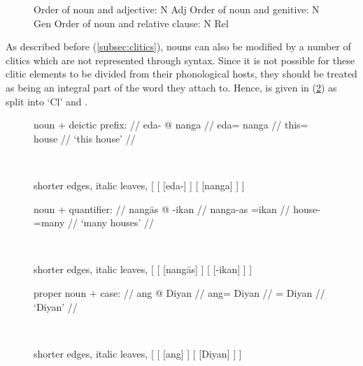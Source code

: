 \begin{figure}
\pex\label{ex:nptyp}
\a Order of noun and adjective: N Adj
\a Order of noun and genitive: N Gen
\a Order of noun and relative clause: N Rel
\xe
\end{figure}

As described before (\autoref{subsec:clitics}), nouns can also be modified
by a number of clitics which are not represented through syntax. Since it is
not possible for these clitic elements to be divided from their phonological
hosts, they should be treated as being an integral part of the word they attach
to. Hence,  is given in (\ref{ex:nouncltree}) as split into `Cl' and
.

\begin{figure}
\pex\label{ex:nouncltree}
\a %
	\begin{minipage}[t]{.5\remaining}
	\begingl
		\glpreamble noun + deictic prefix: //
		\gla eda- @ nanga //
		\glb eda= nanga //
		\glc this= house //
		\glft `this house' //
	\endgl
	\end{minipage}
	~
	\begin{forest} shorter edges, italic leaves,
	[
		[
			[eda-]
		]
		[
			[nanga]
		]
	]
	\end{forest}

\a %
	\begin{minipage}[t]{.5\remaining}
	\begingl
		\glpreamble noun + quantifier: //
		\gla nangās @ -ikan //
		\glb nanga-as =ikan //
		\glc house-\Parg{} =many //
		\glft `many houses' //
	\endgl
	\end{minipage}
	~
	\begin{forest} shorter edges, italic leaves,
	[
		[
			[nangās]
		]
		[
			[-ikan]
		]
	]
	\end{forest}

\a %
	\begin{minipage}[t]{.5\remaining}
	\begingl
		\glpreamble proper noun + case: //
		\gla ang @ Diyan //
		\glb ang= Diyan //
		\glc \Aarg{}= Diyan //
		\glft `Diyan' //
	\endgl
	\end{minipage}
	~
	\begin{forest} shorter edges, italic leaves,
	[
		[
			[ang]
		]
		[
			[Diyan]
		]
	]
	\end{forest}

\xe
\end{figure}

